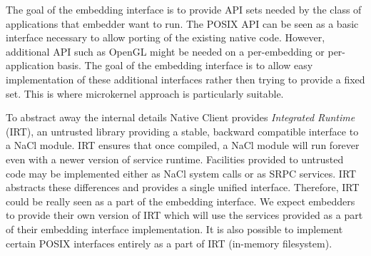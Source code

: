 The goal of the embedding interface is to provide API sets needed by the
class of applications that embedder want to run. The POSIX API can be
seen as a basic interface necessary to allow porting of the existing
native code. However, additional API such as OpenGL might be needed on a
per-embedding or per-application basis. The goal of the embedding
interface is to allow easy implementation of these additional interfaces
rather then trying to provide a fixed set. This is where microkernel
approach is particularly suitable.

To abstract away the internal details Native Client provides
\emph{Integrated Runtime} (IRT), an untrusted library providing a
stable, backward compatible interface to a NaCl module. IRT ensures that
once compiled, a NaCl module will run forever even with a newer version
of service runtime. Facilities provided to untrusted code may be
implemented either as NaCl system calls or as SRPC services. IRT
abstracts these differences and provides a single unified interface.
Therefore, IRT could be really seen as a part of the embedding
interface. We expect embedders to provide their own version of IRT which
will use the services provided as a part of their embedding interface
implementation. It is also possible to implement certain POSIX
interfaces entirely as a part of IRT (\eg in-memory filesystem).





